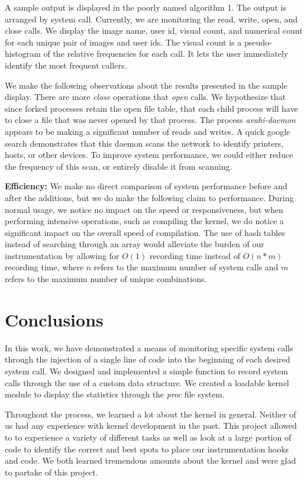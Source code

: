 \documentclass[conference]{IEEEtran}
\begin{document}
A sample output is displayed in the poorly named algorithm 1.
The output is arranged by system call.  Currently, we are monitoring the read, write, open, and close calls.
We display the image name, user id, visual count, and numerical count for each unique pair of images and user ids.
The visual count is a pseudo-histogram of the relative frequencies for each call.
It lets the user immediately identify the most frequent callers.

We make the following observations about the results presented in the sample display.
There are more \textit{close} operations that \textit{open} calls.
We hypothesize that since forked processes retain the open file table, that each child process will have to close a file that was never opened by that process.
The process \textit{avahi-daemon} appears to be making a significant number of reads and writes.
A quick google search demonstrates that this daemon scans the network to identify printers, hosts, or other devices.
To improve system performance, we could either reduce the frequency of this scan, or entirely disable it from scanning.

\textbf{Efficiency:} We make no direct comparison of system performance before and after the additions, but we do make the following claim to performance.
During normal usage, we notice no impact on the speed or responsiveness, but when performing intensive operations, such as compiling the kernel, we do notice a significant impact on the overall speed of compilation.
The use of hash tables instead of searching through an array would alleviate the burden of our instrumentation by allowing for $O(1)$ recording time instead of $O(n*m)$ recording time, where $n$ refers to the maximum number of system calls and $m$ refers to the maximum number of unique combinations.

\section{Conclusions}
\label{sec:conclusions}
In this work, we have demonstrated a means of monitoring specific system calls through the injection of a single line of code into the beginning of each desired system call.
We designed and implemented a simple function to record system calls through the use of a custom data structure.
We created a loadable kernel module to display the statistics through the \textit{proc} file system.

Throughout the process, we learned a lot about the kernel in general.
Neither of us had any experience with kernel development in the past.
This project allowed to to experience a variety of different tasks as well as look at a large portion of code to identify the correct and best spots to place our instrumentation hooks and code.
We both learned tremendous amounts about the kernel and were glad to partake of this project.
\end{document}

